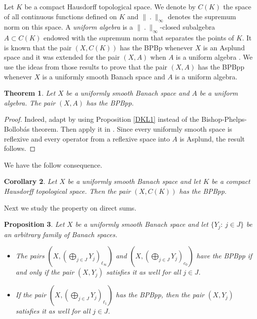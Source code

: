 \documentclass[12pt,a4paper]{amsart}
\newtheorem{theorem}{Theorem}[section]
\newtheorem{proposition}[theorem]{Proposition}
\newtheorem{corollary}[theorem]{Corollary}
\theoremstyle{definition}
\numberwithin{equation}{section}
\newcommand{\K}{\mathbb{K}} %
\def\K{{\mathbb K}}
\begin{document}
Let $K$ be a compact Hausdorff topological space. We denote by $C(K)$ the space of all continuous functions defined on $K$ and $\| \ . \ \|_{\infty}$ denotes the supremum norm on this space. A {\it uniform algebra} is a $\| \ . \ \|_{\infty}$-closed subalgebra $A \subset C(K)$ endowed with the supremum norm that separates the points of $K$. It is known that the pair $(X, C (K))$ has the BPBp whenever $X$ is an Asplund space \cite[Corollary 2.6]{ACK} and it was extended for the pair $(X, A)$ when $A$ is a uniform algebra \cite[Theorem 3.6]{CGK}. We use the ideas from those results to prove that the pair $(X, A)$ has the BPBpp whenever $X$ is a uniformly smooth Banach space and $A$ is a uniform algebra. 

\begin{theorem} Let $X$ be a uniformly smooth Banach space and $A$ be a uniform algebra. The pair $(X, A)$ has the BPBpp.
\label{DKL8}
\end{theorem}

\begin{proof} Indeed, adapt \cite[Lemma 3.5]{CGK} by using Proposition \ref{DKL1} instead of the Bishop-Phelps-Bollob\'as theorem. Then apply it in \cite[Theorem 3.6]{CGK}. Since every uniformly smooth space is reflexive and every operator from a reflexive space into $A$ is Asplund, the result follows.
\end{proof}

We have the follow consequence.

\begin{corollary} Let $X$ be a uniformly smooth Banach space and let $K$ be a compact Hausdorff topological space. Then the pair $(X, C(K))$ has the BPBpp.
\label{DKL9}
\end{corollary}


Next we study the property on direct sums.


\begin{proposition} Let $X$ be a uniformly smooth Banach space and let $\{Y_j: \ j \in J \}$ be an arbitrary family of Banach spaces.
\begin{itemize}
\item[(a)] The pairs $\left( X, \left( \bigoplus_{j \in J} Y_j \right)_{\ell_{\infty}} \right)$ and $\left( X, \left( \bigoplus_{j \in J} Y_j \right)_{c_0} \right)$ have the BPBpp if and only if the pair $(X, Y_j)$ satisfies it as well for all $j \in J$.
\item[(b)]  If the pair $\left( X, \left( \bigoplus_{j \in J} Y_j \right)_{\ell_1} \right)$ has the BPBpp, then the pair $(X, Y_j)$  satisfies it as well for all $j \in J$.
\end{itemize}
\label{prop100}
\end{proposition}
\end{document}
